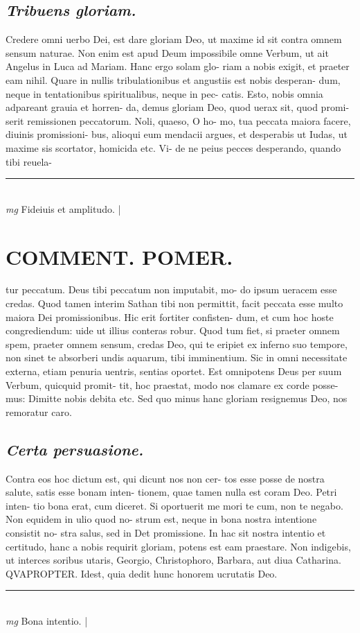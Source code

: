 \documentclass{article}
\begin{document}
\begin{pages}
\subsection*{\textit{Tribuens gloriam. }}\pstart Credere omni uerbo Dei, est dare gloriam Deo, ut maxime id sit contra omnem sensum naturae. Non enim est apud Deum impossibile omne Verbum, ut ait Angelus in Luca ad Mariam. Hanc ergo solam glo- riam a nobis exigit, et praeter eam nihil. Quare in nullis tribulationibus et angustiis est nobis desperan- dum, neque in tentationibus spiritualibus, neque in pec- catis. Esto, nobis omnia adpareant grauia et horren- da, demus gloriam Deo, quod uerax sit, quod promi- serit remissionen peccatorum. Noli, quaeso, O ho- mo, tua peccata maiora facere, diuinis promissioni- bus, alioqui eum mendacii argues, et desperabis ut Iudas, ut maxime sis scortator, homicida etc. Vi- de ne peius pecces desperando, quando tibi reuela-  \pend
\vspace{0.5cm}\noindent
\vspace{0.2cm}\rule{1cm}{0.2pt}\\ 
\hspace{0.2cm}\textit{mg}
\footnotesize Fideiuis et amplitudo.  
\normalsize| 
\section*{COMMENT. POMER.  }\pstart tur peccatum. Deus tibi peccatum non imputabit, mo- do ipsum ueracem esse credas. Quod tamen interim Sathan tibi non permittit, facit peccata esse multo maiora Dei promissionibus. Hic erit fortiter confisten- dum, et cum hoc hoste congrediendum: uide ut illius conteras robur. Quod tum fiet, si praeter omnem spem, praeter omnem sensum, credas Deo, qui te eripiet ex inferno suo tempore, non sinet te absorberi undis aquarum, tibi imminentium. Sic in omni necessitate externa, etiam penuria uentris, sentias oportet. Est omnipotens Deus per suum Verbum, quicquid promit- tit, hoc praestat, modo nos clamare ex corde posse- mus: Dimitte nobis debita etc. Sed quo minus hanc gloriam resignemus Deo, nos remoratur caro.   \pend
{}
{}
\subsection*{\textit{Certa persuasione. }}\pstart Contra eos hoc dictum est, qui dicunt nos non cer- tos esse posse de nostra salute, satis esse bonam inten- tionem, quae tamen nulla est coram Deo. Petri inten- tio bona erat, cum diceret. Si oportuerit me mori te cum, non te negabo. Non equidem in ulio quod no- strum est, neque in bona nostra intentione consistit no- stra salus, sed in Det promissione. In hac sit nostra intentio et certitudo, hanc a nobis requirit gloriam, potens est eam praestare. Non indigebis, ut interces soribus utaris, Georgio, Christophoro, Barbara, aut diua Catharina. QVAPROPTER. Idest, quia dedit hunc honorem ucrutatis Deo.   \pend
\vspace{0.5cm}\noindent
\vspace{0.2cm}\rule{1cm}{0.2pt}\\ 
\hspace{0.2cm}\textit{mg}
\footnotesize Bona intentio. 
\normalsize| 

\end{pages}
\end{document}
